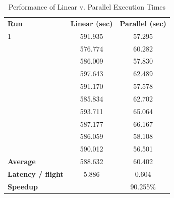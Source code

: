     
    \begin{table}[tb]
        \caption{\small{Performance of Linear v. Parallel Execution Times}}
        \vspace{3pt}
        \label{tab:performance_results}
        \centering
        \begin{tabular}{@{} >{\centering\arraybackslash} m{.23\linewidth} S[table-format=3.3] S[table-format=2.3] @{}}
            \hline\noalign{\smallskip}
            \bfseries Run & \bfseries Linear (sec) & \bfseries Parallel (sec) \\
            \noalign{\smallskip}
            \hline
            \noalign{\smallskip}
             1 & 591.935 & 57.295 \\  & 576.774 & 60.282 \\  & 586.009 & 57.830 \\  & 597.643 & 62.489 \\  & 591.170 & 57.578 \\  & 585.834 & 62.702 \\  & 593.711 & 65.064 \\  & 587.177 & 66.167 \\  & 586.059 & 58.108 \\  & 590.012 & 56.501 \\ \hline
            \hline
            \bfseries Average           & 588.632 & 60.402   \\ \hline
            \bfseries Latency / flight  &   5.886 &  0.604   \\ \hline
            \bfseries Speedup           &         & 90.255\% \\ \hline
        \end{tabular}
    \end{table}
    
    
    
    